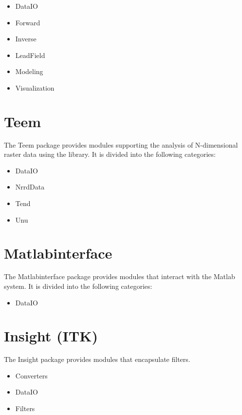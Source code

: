 \begin{itemize}
\item DataIO
\item Forward
\item Inverse
\item LeadField
\item Modeling
\item Visualization
\end{itemize}

\section{Teem}
\label{sec:teempackage}

The Teem package provides modules supporting the analysis of
N-dimensional raster data using the
library.  It is divided into the following categories:

\begin{itemize}
\item DataIO
\item NrrdData
\item Tend
\item Unu
\end{itemize}

\section{Matlabinterface}
\label{sec:matlabpackage}

The Matlabinterface package provides modules that interact with the
Matlab system.  It is divided into the following categories:

\begin{itemize}
\item DataIO
\end{itemize}

\section{Insight (ITK)}
\label{sec:insightpackage}

The Insight package provides modules that encapsulate
 filters.

\begin{itemize}
\item Converters
\item DataIO
\item Filters
\end{itemize}




